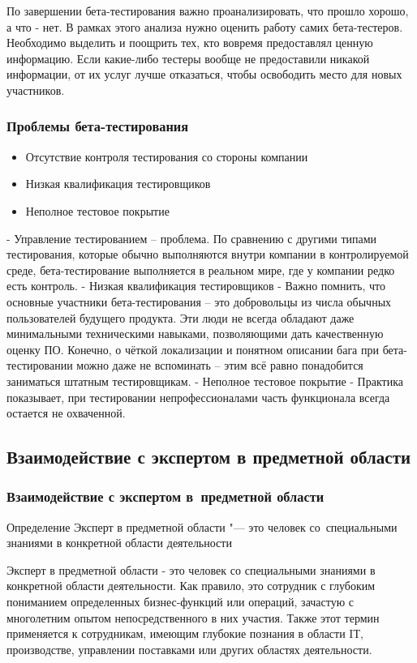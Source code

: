 \documentclass{../industrial-development}
\begin{document}
\lecturenotes
По завершении бета-тестирования важно проанализировать, что прошло хорошо, а что - нет. В рамках этого анализа нужно оценить работу самих бета-тестеров. Необходимо выделить и поощрить тех, кто вовремя предоставлял ценную информацию. Если какие-либо тестеры вообще не предоставили никакой информации, от их услуг лучше отказаться, чтобы освободить место для новых участников.

\begin{frame} \frametitle{Проблемы бета-тестирования}
	\begin{itemize}
		\item Отсутствие контроля тестирования со стороны компании
		\item Низкая квалификация тестировщиков
		\item Неполное тестовое покрытие
	\end{itemize}
\end{frame}

\lecturenotes
- Управление тестированием – проблема. По сравнению с другими типами тестирования, которые обычно выполняются внутри компании в контролируемой среде, бета-тестирование выполняется в реальном мире, где у компании редко есть контроль.
- Низкая квалификация тестировщиков - Важно помнить, что основные участники бета-тестирования – это добровольцы из числа обычных пользователей будущего продукта. Эти люди не всегда обладают даже минимальными техническими навыками, позволяющими дать качественную оценку ПО. Конечно, о чёткой локализации и понятном описании бага при бета-тестировании можно даже не вспоминать – этим всё равно понадобится заниматься штатным тестировщикам.
- Неполное тестовое покрытие - Практика показывает, при тестировании непрофессионалами часть функционала всегда остается не охваченной.

\subsection{Взаимодействие с экспертом в предметной области}
\begin{frame} \frametitle{Взаимодействие с экспертом в~предметной области}
	\begin{block}{Определение}
		\alert{Эксперт в предметной области} "--- это человек со~специальными знаниями в конкретной области деятельности
	\end{block}
\end{frame}
\lecturenotes
Эксперт в предметной области - это человек со специальными знаниями в конкретной области деятельности. Как правило, это сотрудник с глубоким пониманием определенных бизнес-функций или операций, зачастую с многолетним опытом непосредственного в них участия. Также этот термин применяется к сотрудникам, имеющим глубокие познания в области IТ, производстве, управлении поставками или других областях деятельности.
 
\end{document}
